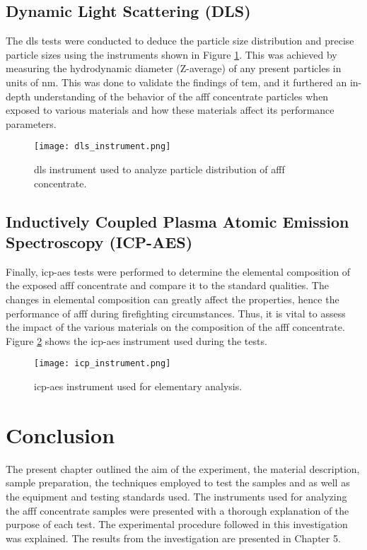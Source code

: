 \subsection{Dynamic Light Scattering (DLS)}
The \acrshort{dls} tests were conducted to deduce the particle size distribution and precise particle sizes using the instruments shown in Figure \ref{ch4:figure:dls}. This was achieved by measuring the hydrodynamic diameter (Z-average) of any present particles in units of nm. This was done to validate the findings of \acrshort{tem}, and it furthered an in-depth understanding of the behavior of the \acrshort{afff} concentrate particles when exposed to various materials and how these materials affect its performance parameters.
 
\begin{figure}[H]
    \texttt{[image: dls\_instrument.png]}
    \caption{\acrshort{dls} instrument used to analyze particle distribution of \acrshort{afff} concentrate.}
    \label{ch4:figure:dls}
\end{figure}

\subsection{Inductively Coupled Plasma Atomic Emission Spectroscopy (ICP-AES)}
Finally, \acrshort{icp-aes} tests were performed to determine the elemental composition of the exposed \acrshort{afff} concentrate and compare it to the standard qualities. The changes in elemental composition can greatly affect the properties, hence the performance of \acrshort{afff} during firefighting circumstances. Thus, it is vital to assess the impact of the various materials on the composition of the \acrshort{afff} concentrate. Figure \ref{ch4:figure:icp-aes} shows the \acrshort{icp-aes} instrument used during the tests.
 
\begin{figure}[H]
    \texttt{[image: icp\_instrument.png]}
    \caption{\acrshort{icp-aes} instrument used for elementary analysis.}
    \label{ch4:figure:icp-aes}
\end{figure}

\section{Conclusion}
The present chapter outlined the aim of the experiment, the material description, sample preparation, the techniques employed to test the samples and as well as the equipment and testing standards used. The instruments used for analyzing the \acrshort{afff} concentrate samples were presented with a thorough explanation of the purpose of each test. The experimental procedure followed in this investigation was explained. The results from the investigation are presented in Chapter 5.